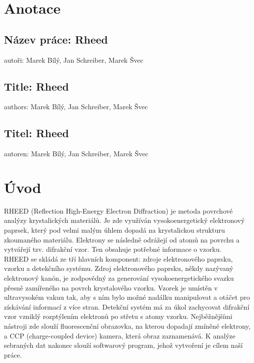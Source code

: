 \documentclass[a4paper]{article}
\begin{document}
\newpage

\tableofcontents

\newpage

\section*{Anotace}

\subsection*{Název práce: Rheed}
autoři: Marek Bílý, Jan Schreiber, Marek Švec
\vspace{0.5cm}

\subsection*{Title: Rheed}
authors: Marek Bílý, Jan Schreiber, Marek Švec
\vspace{0.5cm}

\subsection*{Titel: Rheed}
autoren: Marek Bílý, Jan Schreiber, Marek Švec
\vspace{0.5cm}
\newpage
\section{Úvod}
    RHEED (Reflection High-Energy Electron Diffraction) je metoda povrchové analýzy krystalických materiálů. Je zde využíván vysokoenergetický elektronový paprsek, který pod velmi malým úhlem dopadá na krystalickou strukturu zkoumaného materiálu. Elektrony se následně odrážejí od atomů na povrchu a vytvářejí tzv. difrakční vzor. Ten obsahuje potřebné informace o vzorku.\\

    RHEED se skládá ze tří hlavních komponent: zdroje elektronového paprsku, vzorku a detekčního systému. Zdroj elektronového paprsku, někdy nazývaný elektronový kanón, je zodpovědný za generování vysokoenergetického svazku přesně zamířeného na povrch krystalového vzorku. Vzorek je umístěn v ultravysokém vakuu tak, aby s ním bylo možné nadálku manipulovat a otáčet pro získávání informací z více stran. Detekční systém má za úkol zachycovat difrakční vzor vzniklý rozptýlením elektronů po střetu s atomy vzorku. Nejběžnějšími nástroji zde slouží fluorescenční obrazovka, na kterou dopadají zmíněné elektrony, a CCP (charge-coupled device) kamera, která obraz zaznamenává. K analýze sebraných dat nakonec slouží softwarový program, jehož vytvoření je cílem naší práce.
    
\end{document}
